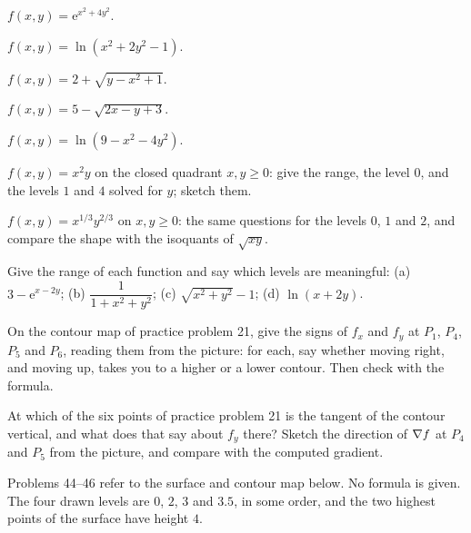 \begin{problems}[resume]
  \item $f(x,y)=\mathrm{e}^{x^{2}+4y^{2}}$.
  \item $f(x,y)=\ln(x^{2}+2y^{2}-1)$.
  \item $f(x,y)=2+\sqrt{y-x^{2}+1}$.
  \item $f(x,y)=5-\sqrt{2x-y+3}$.
  \item $f(x,y)=\ln(9-x^{2}-4y^{2})$.
  \item $f(x,y)=x^{2}y$ on the closed quadrant $x,y\ge0$: give the range,
        the level $0$, and the levels $1$ and $4$ solved for $y$; sketch
        them.
  \item $f(x,y)=x^{1/3}y^{2/3}$ on $x,y\ge0$: the same questions for the
        levels $0$, $1$ and $2$, and compare the shape with the isoquants
        of $\sqrt{xy}$.
  \item Give the range of each function and say which levels are
        meaningful: (a) $3-\mathrm{e}^{x-2y}$; (b) $\dfrac{1}{1+x^{2}+y^{2}}$;
        (c) $\sqrt{x^{2}+y^{2}}-1$; (d) $\ln(x+2y)$.
  \item On the contour map of practice problem 21, give the signs of $f_{x}$ and
        $f_{y}$ at $P_{1}$, $P_{4}$, $P_{5}$ and $P_{6}$, reading them from
        the picture: for each, say whether moving right, and moving up,
        takes you to a higher or a lower contour. Then check with the
        formula.
  \item At which of the six points of practice problem 21 is the tangent of the
        contour vertical, and what does that say about $f_{y}$ there?
        Sketch the direction of $\nabla f$ at $P_{4}$ and $P_{5}$ from the
        picture, and compare with the computed gradient.
\end{problems}

Problems 44--46 refer to the surface and contour map below. No formula is
given. The four drawn levels are $0$, $2$, $3$ and $3.5$, in some order,
and the two highest points of the surface have height $4$.

